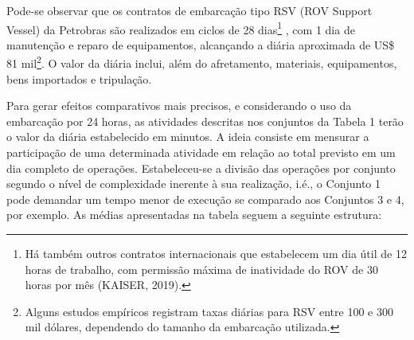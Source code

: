 Pode-se observar que os contratos de embarcação tipo RSV (ROV Support Vessel) da Petrobras são realizados em ciclos de 28 dias\footnote{Há também outros contratos internacionais que estabelecem um dia útil de 12 horas de trabalho, com permissão máxima de inatividade do ROV de 30 horas por mês (KAISER, 2019).} , com 1 dia de manutenção e reparo de equipamentos, alcançando a diária aproximada de US\$ 81 mil\footnote{Alguns estudos empíricos registram taxas diárias para RSV entre 100 e 300 mil dólares, dependendo do tamanho da embarcação utilizada.}. O valor da diária inclui, além do afretamento, materiais, equipamentos, bens importados e tripulação. 

Para gerar efeitos comparativos mais precisos, e considerando o uso da embarcação por 24 horas, as atividades descritas nos conjuntos da Tabela 1 terão o valor da diária estabelecido em minutos. A ideia consiste em mensurar a participação de uma determinada atividade em relação ao total previsto em um dia completo de operações. 
Estabeleceu-se a divisão das operações por conjunto segundo o nível de complexidade inerente à sua realização, i.é., o Conjunto 1 pode demandar um tempo menor de execução se comparado aos Conjuntos 3 e 4, por exemplo. As médias apresentadas na tabela seguem a seguinte estrutura:

